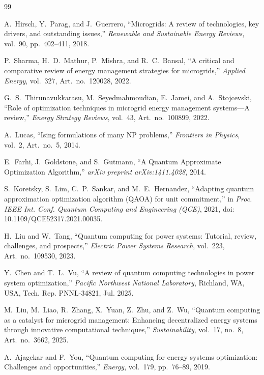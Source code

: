 \documentclass[11pt,a4paper]{article}
\theoremstyle{definition}
\theoremstyle{remark}
\begin{document}
\begin{thebibliography}{99}

A.~Hirsch, Y.~Parag, and J.~Guerrero, ``Microgrids: A review of technologies, key drivers, and outstanding issues,'' \textit{Renewable and Sustainable Energy Reviews}, vol.~90, pp.~402--411, 2018.

P.~Sharma, H.~D.~Mathur, P.~Mishra, and R.~C.~Bansal, ``A critical and comparative review of energy management strategies for microgrids,'' \textit{Applied Energy}, vol.~327, Art.~no.~120028, 2022.

G.~S.~Thirunavukkarasu, M.~Seyedmahmoudian, E.~Jamei, and A.~Stojcevski, ``Role of optimization techniques in microgrid energy management systems---A review,'' \textit{Energy Strategy Reviews}, vol.~43, Art.~no.~100899, 2022.

A.~Lucas, ``Ising formulations of many NP problems,'' \textit{Frontiers in Physics}, vol.~2, Art.~no.~5, 2014.

E.~Farhi, J.~Goldstone, and S.~Gutmann, ``A Quantum Approximate Optimization Algorithm,'' \textit{arXiv preprint arXiv:1411.4028}, 2014.

S.~Koretsky, S.~Lim, C.~P.~Sankar, and M.~E.~Hernandez, ``Adapting quantum approximation optimization algorithm (QAOA) for unit commitment,'' in \textit{Proc. IEEE Int. Conf. Quantum Computing and Engineering (QCE)}, 2021, doi: 10.1109/QCE52317.2021.00035.

H.~Liu and W.~Tang, ``Quantum computing for power systems: Tutorial, review, challenges, and prospects,'' \textit{Electric Power Systems Research}, vol.~223, Art.~no.~109530, 2023.

Y.~Chen and T.~L.~Vu, ``A review of quantum computing technologies in power system optimization,'' \textit{Pacific Northwest National Laboratory}, Richland, WA, USA, Tech. Rep. PNNL-34821, Jul. 2025.

M.~Liu, M.~Liao, R.~Zhang, X.~Yuan, Z.~Zhu, and Z.~Wu, ``Quantum computing as a catalyst for microgrid management: Enhancing decentralized energy systems through innovative computational techniques,'' \textit{Sustainability}, vol.~17, no.~8, Art.~no.~3662, 2025.

A.~Ajagekar and F.~You, ``Quantum computing for energy systems optimization: Challenges and opportunities,'' \textit{Energy}, vol.~179, pp.~76--89, 2019.


\end{thebibliography}
\end{document}
